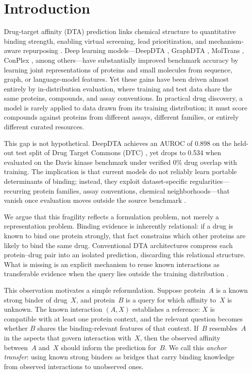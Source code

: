 \section{Introduction}

Drug-target affinity (DTA) prediction links chemical structure to quantitative binding strength, enabling virtual screening, lead prioritization, and mechanism-aware repurposing \cite{vamathevan2019ai_drug,chen2018rise}. Deep learning models---DeepDTA \cite{ozturk2018deepdta}, GraphDTA \cite{nguyen2021graphdta}, MolTrans \cite{huang2021moltrans}, ConPlex \cite{singh2023conplex}, among others---have substantially improved benchmark accuracy by learning joint representations of proteins and small molecules from sequence, graph, or language-model features. Yet these gains have been driven almost entirely by in-distribution evaluation, where training and test data share the same proteins, compounds, and assay conventions. In practical drug discovery, a model is rarely applied to data drawn from its training distribution; it must score compounds against proteins from different assays, different families, or entirely different curated resources.

This gap is not hypothetical. DeepDTA achieves an AUROC of 0.898 on the held-out test split of Drug Target Commons (DTC) \cite{tang2014dtc}, yet drops to 0.534 when evaluated on the Davis kinase benchmark \cite{davis2011kinase} under verified 0\% drug overlap with training. The implication is that current models do not reliably learn portable determinants of binding; instead, they exploit dataset-specific regularities---recurring protein families, assay conventions, chemical neighborhoods---that vanish once evaluation moves outside the source benchmark \cite{pahikkala2015kronrls,mayr2018deeptox}.

We argue that this fragility reflects a formulation problem, not merely a representation problem. Binding evidence is inherently relational: if a drug is known to bind one protein strongly, that fact constrains which other proteins are likely to bind the same drug. Conventional DTA architectures compress each protein--drug pair into an isolated prediction, discarding this relational structure. What is missing is an explicit mechanism to reuse known interactions as transferable evidence when the query lies outside the training distribution \cite{pan2010transfer,zhuang2021transfer}.

This observation motivates a simple reformulation. Suppose protein~$A$ is a known strong binder of drug~$X$, and protein~$B$ is a query for which affinity to~$X$ is unknown. The known interaction $(A, X)$ establishes a reference: $X$ is compatible with at least one protein context, and the relevant question becomes whether $B$ shares the binding-relevant features of that context. If~$B$ resembles~$A$ in the aspects that govern interaction with~$X$, then the observed affinity between~$A$ and~$X$ should inform the prediction for~$B$. We call this \emph{anchor transfer}: using known strong binders as bridges that carry binding knowledge from observed interactions to unobserved ones.

